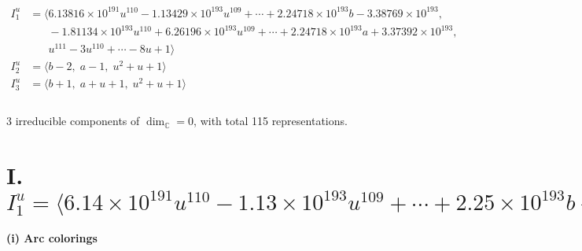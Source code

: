 \documentclass[1p]{elsarticle_modified}
\theoremstyle{definition}
\begin{document}
\begin{align*}
I^u_{1}&=\langle 
6.13816\times10^{191} u^{110}-1.13429\times10^{193} u^{109}+\cdots+2.24718\times10^{193} b-3.38769\times10^{193},\\
\phantom{I^u_{1}}&\phantom{= \langle  }-1.81134\times10^{193} u^{110}+6.26196\times10^{193} u^{109}+\cdots+2.24718\times10^{193} a+3.37392\times10^{193},\\
\phantom{I^u_{1}}&\phantom{= \langle  }u^{111}-3 u^{110}+\cdots-8 u+1\rangle \\
I^u_{2}&=\langle 
b-2,\;a-1,\;u^2+u+1\rangle \\
I^u_{3}&=\langle 
b+1,\;a+u+1,\;u^2+u+1\rangle \\
\\
\end{align*}
\raggedright * 3 irreducible components of $\dim_{\mathbb{C}}=0$, with total 115 representations.\\
\newpage
\renewcommand{\arraystretch}{1}
\centering \section*{I. $I^u_{1}= \langle 6.14\times10^{191} u^{110}-1.13\times10^{193} u^{109}+\cdots+2.25\times10^{193} b-3.39\times10^{193},\;-1.81\times10^{193} u^{110}+6.26\times10^{193} u^{109}+\cdots+2.25\times10^{193} a+3.37\times10^{193},\;u^{111}-3 u^{110}+\cdots-8 u+1 \rangle$}
\flushleft \textbf{(i) Arc colorings}\\
\end{document}

